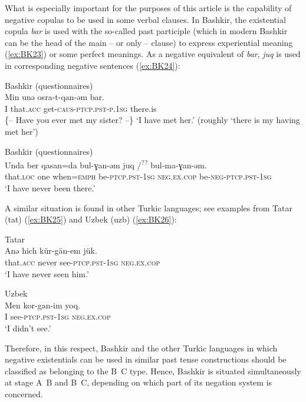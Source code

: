 \documentclass[output=paper,draft,draftmode,colorlinks,citecolor=brown]{langscibook}
\begin{document}
What is especially important for the purposes of this article is the capability of negative copulas to be used in some verbal clauses. In Bashkir, the existential copula \textit{bar} is used with the so-called past participle (which in modern Bashkir can be the head of the main – or only – clause) to express experiential meaning (\ref{ex:BK23}) or some perfect meanings. As a negative equivalent of \textit{bar}, \textit{juq} is used in corresponding negative sentences (\ref{ex:BK24}):

\ea Bashkir (questionnaires) \label{ex:BK23}\\
	\gll Min	unǝ		osra-t-qan-ǝm				bar.\\
	I		that.\textsc{acc}	get-\textsc{caus-ptcp.pst-p.1sg}	there.is\\
	\glt \{– Have you ever met my sister? –\} `I have met her.' (roughly `there is my having met her')
\z

\ea Bashkir (questionnaires) \label{ex:BK24}\\
	\gll Unda		ber	qasan=da		bul-ɣan-ǝm		juq {/\textsuperscript{??} bul-ma-ɣan-ǝm.}\\
	that.\textsc{loc}	one	when=\textsc{emph}	be-\textsc{ptcp.pst-1sg}	\textsc{neg.ex.cop}  be-\textsc{neg-ptcp.pst-1sg}\\
	\glt `I have never been there.'
\z

A similar situation is found in other Turkic languages; see examples from Tatar (tat) (\ref{ex:BK25}) and Uzbek (uzb) (\ref{ex:BK26}):

\ea Tatar \citep[126]{poppe1961a} \label{ex:BK25}\\
	\gll Anǝ		hich		kür-gän-em			jük.\\
	that.\textsc{acc}	never		see-\textsc{ptcp.pst-1sg}	\textsc{neg.ex.cop}\\
	\glt `I have never seen him.'\footnotemark
\z


\newpage
\ea Uzbek \citep[123]{sjoberg1963a} \label{ex:BK26}\\
	\gll Men	kor-gan-im			yoq.\\
	I		see-\textsc{ptcp.pst-1sg}	\textsc{neg.ex.cop}\\
	\glt `I didn’t see.'
\z

Therefore, in this respect, Bashkir and the other Turkic languages in which negative existentials can be used in similar past tense constructions should be classified as belonging to the B~C type. Hence, Bashkir is situated simultaneously at stage A~B and B~C, depending on which part of its negation system is concerned.
\end{document}
